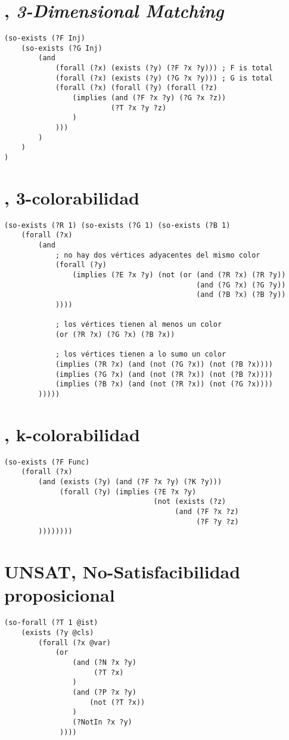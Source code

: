 \section{\TDM, \textit{3-Dimensional Matching}}
\begin{verbatim}
(so-exists (?F Inj)
    (so-exists (?G Inj)
        (and
            (forall (?x) (exists (?y) (?F ?x ?y))) ; F is total
            (forall (?x) (exists (?y) (?G ?x ?y))) ; G is total
            (forall (?x) (forall (?y) (forall (?z)
                (implies (and (?F ?x ?y) (?G ?x ?z))
                         (?T ?x ?y ?z)
                )
            )))
        )
    )
)
\end{verbatim}

\section{\TCOL, 3-colorabilidad}
\begin{verbatim}
(so-exists (?R 1) (so-exists (?G 1) (so-exists (?B 1)
    (forall (?x) 
        (and
            ; no hay dos vértices adyacentes del mismo color
            (forall (?y)
                (implies (?E ?x ?y) (not (or (and (?R ?x) (?R ?y))
                                             (and (?G ?x) (?G ?y))
                                             (and (?B ?x) (?B ?y))
            ))))

            ; los vértices tienen al menos un color
            (or (?R ?x) (?G ?x) (?B ?x))

            ; los vértices tienen a lo sumo un color
            (implies (?R ?x) (and (not (?G ?x)) (not (?B ?x))))
            (implies (?G ?x) (and (not (?R ?x)) (not (?B ?x))))
            (implies (?B ?x) (and (not (?R ?x)) (not (?G ?x))))
        )))))
\end{verbatim}

\section{\KCOL, k-colorabilidad}
\begin{verbatim}
(so-exists (?F Func)
    (forall (?x) 
        (and (exists (?y) (and (?F ?x ?y) (?K ?y)))
             (forall (?y) (implies (?E ?x ?y)
                                   (not (exists (?z)
                                        (and (?F ?x ?z)
                                             (?F ?y ?z)
        ))))))))
\end{verbatim}

\section{UNSAT, No-Satisfacibilidad proposicional}
\begin{verbatim}
(so-forall (?T 1 @ist)
    (exists (?y @cls)
        (forall (?x @var)
            (or
                (and (?N ?x ?y)
                     (?T ?x)
                )
                (and (?P ?x ?y)
                    (not (?T ?x))
                )
                (?NotIn ?x ?y)
             ))))
\end{verbatim}

